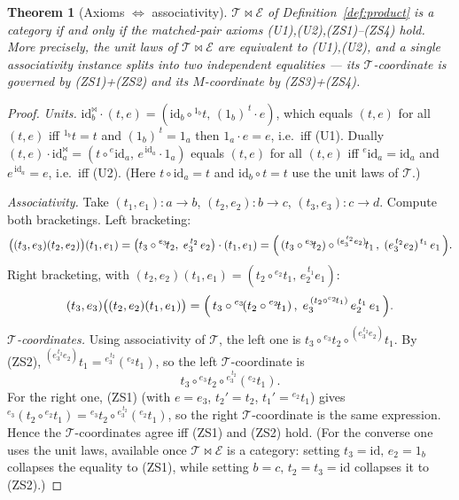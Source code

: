 \documentclass[11pt]{article}
\newtheorem{theorem}{Theorem}
\theoremstyle{definition}
\newcommand{\id}{\mathrm{id}}
\newcommand{\T}{\mathcal{T}}
\newcommand{\E}{\mathcal{E}}
\newcommand{\lact}[2]{{}^{#1}\!#2}      %
\newcommand{\rest}[2]{#1^{\,#2}}        %
\begin{document}
\begin{theorem}[Axioms $\iff$ associativity]\label{thm:axioms-assoc}
$\T\bowtie\E$ of Definition~\ref{def:product} is a category if and only if the
matched-pair axioms \textnormal{(U1),(U2),(ZS1)--(ZS4)} hold. More precisely, the
unit laws of $\T\bowtie\E$ are equivalent to \textnormal{(U1),(U2)}, and a single
associativity instance splits into two independent equalities --- its
$\T$-coordinate is governed by \textnormal{(ZS1)+(ZS2)} and its $M$-coordinate by
\textnormal{(ZS3)+(ZS4)}.
\end{theorem}

\begin{proof}
\emph{Units.} $\id^{\bowtie}_b\cdot(t,e)=(\id_b\circ\lact{1_b}{t},\,
\rest{(1_b)}{t}\cdot e)$, which equals $(t,e)$ for all $(t,e)$ iff
$\lact{1_b}{t}=t$ and $\rest{(1_b)}{t}=1_a$ then $1_a\cdot e=e$, i.e.\ iff (U1).
Dually $(t,e)\cdot\id^{\bowtie}_a=(t\circ\lact{e}{\id_a},\,\rest{e}{\id_a}\cdot
1_a)$ equals $(t,e)$ for all $(t,e)$ iff $\lact{e}{\id_a}=\id_a$ and
$\rest{e}{\id_a}=e$, i.e.\ iff (U2). (Here $t\circ\id_a=t$ and $\id_b\circ t=t$
use the unit laws of $\T$.)

\emph{Associativity.} Take
$(t_1,e_1):a\to b$, $(t_2,e_2):b\to c$, $(t_3,e_3):c\to d$. Compute both
bracketings. Left bracketing:
\[
  \bigl((t_3,e_3)(t_2,e_2)\bigr)(t_1,e_1)
  =\bigl(t_3\circ\lact{e_3}{t_2},\;\rest{e_3}{t_2}\,e_2\bigr)\cdot(t_1,e_1)
  =\Bigl(\,(t_3\circ\lact{e_3}{t_2})\circ\lact{(\rest{e_3}{t_2}e_2)}{t_1}\,,\;
  \rest{(\rest{e_3}{t_2}e_2)}{t_1}\,e_1\,\Bigr).
\]
Right bracketing, with $(t_2,e_2)(t_1,e_1)=(t_2\circ\lact{e_2}{t_1},\,
\rest{e_2}{t_1}e_1)$:
\[
  (t_3,e_3)\bigl((t_2,e_2)(t_1,e_1)\bigr)
  =\Bigl(\,t_3\circ\lact{e_3}{(t_2\circ\lact{e_2}{t_1})}\,,\;
  \rest{e_3}{(t_2\circ\lact{e_2}{t_1})}\,\rest{e_2}{t_1}\,e_1\,\Bigr).
\]
\emph{$\T$-coordinates.} Using associativity of $\T$, the left one is
$t_3\circ\lact{e_3}{t_2}\circ\lact{(\rest{e_3}{t_2}e_2)}{t_1}$. By (ZS2),
$\lact{(\rest{e_3}{t_2}e_2)}{t_1}=\lact{\rest{e_3}{t_2}}{(\lact{e_2}{t_1})}$, so
the left $\T$-coordinate is
\[
  t_3\circ\lact{e_3}{t_2}\circ\lact{\rest{e_3}{t_2}}{(\lact{e_2}{t_1})}.
\]
For the right one, (ZS1) (with $e=e_3$, $t_2'=t_2$, $t_1'=\lact{e_2}{t_1}$) gives
$\lact{e_3}{(t_2\circ\lact{e_2}{t_1})}=\lact{e_3}{t_2}\circ
\lact{\rest{e_3}{t_2}}{(\lact{e_2}{t_1})}$, so the right $\T$-coordinate is the
same expression. Hence the $\T$-coordinates agree iff (ZS1) and (ZS2) hold.
(For the converse one uses the unit laws, available once $\T\bowtie\E$ is a
category: setting $t_3=\id,\,e_2=1_b$ collapses the equality to (ZS1), while
setting $b=c,\,t_2=t_3=\id$ collapses it to (ZS2).)


\end{proof}
\end{document}
